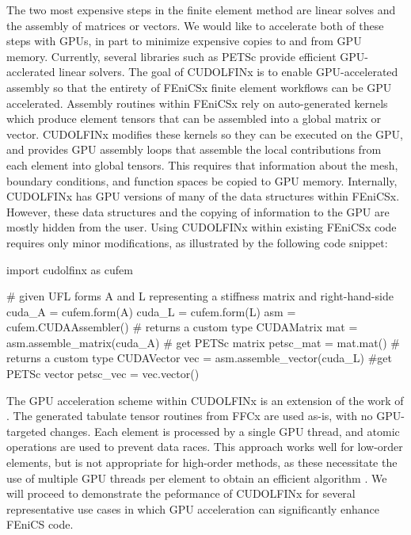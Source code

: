 The two most expensive steps in the finite element method are linear solves and the assembly of matrices or vectors. We would like to accelerate both of these steps with GPUs, in part to minimize expensive copies to and from GPU memory. Currently, several libraries such as PETSc provide efficient GPU-acclerated linear solvers. The goal of CUDOLFINx is to enable GPU-accelerated assembly so that the entirety of FEniCSx finite element workflows can be GPU accelerated. Assembly routines within FEniCSx rely on auto-generated kernels which produce element tensors that can be assembled into a global matrix or vector. CUDOLFINx modifies these kernels so they can be executed on the GPU, and provides GPU assembly loops that assemble the local contributions from each element into global tensors. This requires that information about the mesh, boundary conditions, and function spaces be copied to GPU memory. Internally, CUDOLFINx has GPU versions of many of the data structures within FEniCSx. However, these data structures and the copying of information to the GPU are mostly hidden from the user. Using CUDOLFINx within existing FEniCSx code requires only minor modifications, as illustrated by the following code snippet:

\begin{python}
import cudolfinx as cufem

# given UFL forms A and L representing a stiffness matrix and right-hand-side
cuda_A = cufem.form(A)
cuda_L = cufem.form(L)
asm = cufem.CUDAAssembler()
# returns a custom type CUDAMatrix
mat = asm.assemble_matrix(cuda_A)
# get PETSc matrix
petsc_mat = mat.mat()
# returns a custom type CUDAVector
vec = asm.assemble_vector(cuda_L)
#get PETSc vector
petsc_vec = vec.vector()
\end{python}

The GPU acceleration scheme within CUDOLFINx is an extension of the work of \cite{trotter2023targeting}. The generated tabulate tensor routines from FFCx are used as-is, with no GPU-targeted changes. Each element is processed by a single GPU thread, and atomic operations are used to prevent data races. This approach works well for low-order elements, but is not appropriate for high-order methods, as these necessitate the use of multiple GPU threads per element to obtain an efficient algorithm \cite{MACIOL20101093,dziekonski2013generation,banas2014numerical}. We will proceed to demonstrate the peformance of CUDOLFINx for several representative use cases in which GPU acceleration can significantly enhance FEniCS code.

